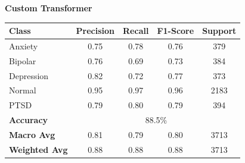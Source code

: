 \begin{center}
    \textbf{Custom Transformer} \\[0.2em]
    \begin{tabular}{|l|c|c|c|c|}
        \hline
        \textbf{Class} & \textbf{Precision} & \textbf{Recall} & \textbf{F1-Score} & \textbf{Support} \\ \hline
        Anxiety        & 0.75               & 0.78            & 0.76              & 379             \\ \hline
        Bipolar        & 0.76               & 0.69            & 0.73              & 384             \\ \hline
        Depression     & 0.82               & 0.72            & 0.77              & 373             \\ \hline
        Normal         & 0.95               & 0.97            & 0.96              & 2183            \\ \hline
        PTSD           & 0.79               & 0.80            & 0.79              & 394             \\ \hline
        \textbf{Accuracy} & \multicolumn{4}{|c|}{88.5\%} \\ \hline
        \textbf{Macro Avg} & 0.81            & 0.79            & 0.80              & 3713            \\ \hline
        \textbf{Weighted Avg} & 0.88         & 0.88            & 0.88              & 3713            \\ \hline
    \end{tabular}
\end{center}


